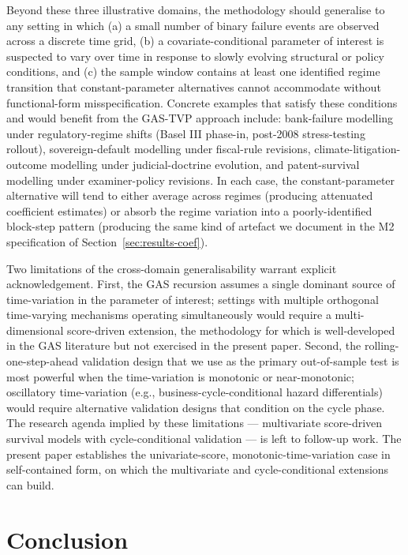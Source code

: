 \documentclass[12pt,a4paper]{article}
\theoremstyle{plain}
\theoremstyle{definition}
\begin{document}
Beyond these three illustrative domains, the methodology should generalise to any setting in which (a) a small number of binary failure events are observed across a discrete time grid, (b) a covariate-conditional parameter of interest is suspected to vary over time in response to slowly evolving structural or policy conditions, and (c) the sample window contains at least one identified regime transition that constant-parameter alternatives cannot accommodate without functional-form misspecification. Concrete examples that satisfy these conditions and would benefit from the GAS-TVP approach include: bank-failure modelling under regulatory-regime shifts (Basel III phase-in, post-2008 stress-testing rollout), sovereign-default modelling under fiscal-rule revisions, climate-litigation-outcome modelling under judicial-doctrine evolution, and patent-survival modelling under examiner-policy revisions. In each case, the constant-parameter alternative will tend to either average across regimes (producing attenuated coefficient estimates) or absorb the regime variation into a poorly-identified block-step pattern (producing the same kind of artefact we document in the M2 specification of Section~\ref{sec:results-coef}).

Two limitations of the cross-domain generalisability warrant explicit acknowledgement. First, the GAS recursion assumes a single dominant source of time-variation in the parameter of interest; settings with multiple orthogonal time-varying mechanisms operating simultaneously would require a multi-dimensional score-driven extension, the methodology for which is well-developed in the GAS literature \cite{harvey2013dynamic} but not exercised in the present paper. Second, the rolling-one-step-ahead validation design that we use as the primary out-of-sample test is most powerful when the time-variation is monotonic or near-monotonic; oscillatory time-variation (e.g., business-cycle-conditional hazard differentials) would require alternative validation designs that condition on the cycle phase. The research agenda implied by these limitations --- multivariate score-driven survival models with cycle-conditional validation --- is left to follow-up work. The present paper establishes the univariate-score, monotonic-time-variation case in self-contained form, on which the multivariate and cycle-conditional extensions can build.

\section{Conclusion}
\label{sec:conclusion}
\end{document}
